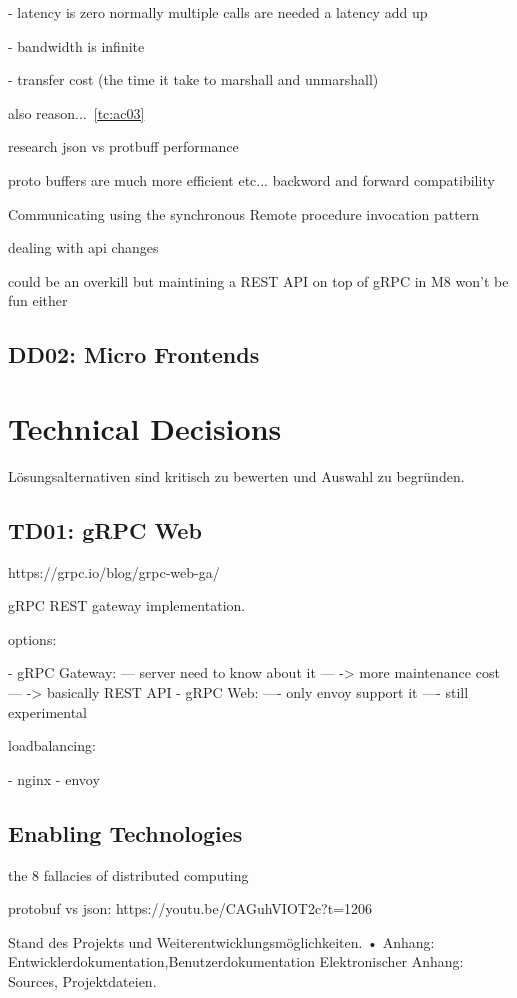 - latency is zero
normally multiple calls are needed a latency add up

- bandwidth is infinite

- transfer cost (the time it take to marshall and unmarshall)

also reason...~\ref{tc:ac03}

research json vs protbuff performance


proto buffers are much more efficient etc...
backword and forward compatibility

Communicating using the synchronous Remote
procedure invocation pattern \citep{richardson2018microservices}

dealing with api changes





could be an overkill but maintining a REST API on top of gRPC in M8 won't be fun either

\subsection{DD02: Micro Frontends}

\section{Technical Decisions}

Lösungsalternativen sind kritisch zu bewerten und Auswahl zu begründen.

\subsection{TD01: gRPC Web}

https://grpc.io/blog/grpc-web-ga/

gRPC REST gateway implementation.

options:

- gRPC Gateway:
--- server need to know about it
--- -> more maintenance cost
--- -> basically REST API
- gRPC Web: 
---- only envoy support it
---- still experimental

loadbalancing:

- nginx
- envoy



\subsection{Enabling Technologies}

the 8 fallacies of distributed computing

protobuf vs json: https://youtu.be/CAGuhVIOT2c?t=1206

Stand des Projekts und Weiterentwicklungsmöglichkeiten.
• Anhang: Entwicklerdokumentation,Benutzerdokumentation
Elektronischer Anhang: Sources, Projektdateien.